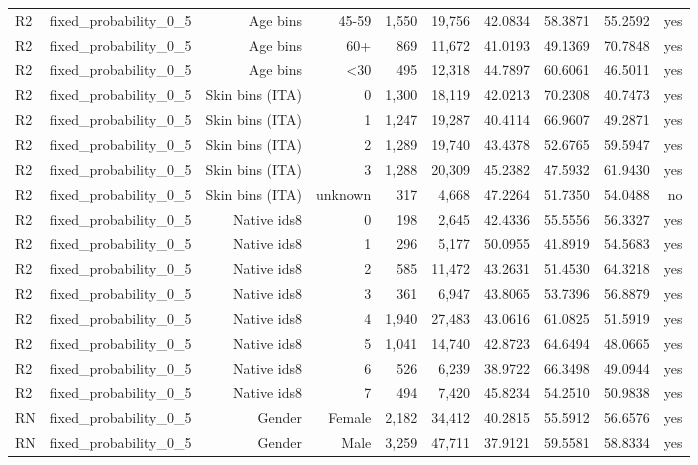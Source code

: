 \documentclass[10pt]{article}
\begin{document}
\begin{longtable}{@{}lrrrrrrrrr@{}}
R2 & fixed\_probability\_0\_5 & Age bins & 45-59 & 1,550 & 19,756 & 42.0834 & 58.3871 & 55.2592 & yes \\
R2 & fixed\_probability\_0\_5 & Age bins & 60+ & 869 & 11,672 & 41.0193 & 49.1369 & 70.7848 & yes \\
R2 & fixed\_probability\_0\_5 & Age bins & \textless{}30 & 495 & 12,318 & 44.7897 & 60.6061 & 46.5011 & yes \\
R2 & fixed\_probability\_0\_5 & Skin bins (ITA) & 0 & 1,300 & 18,119 & 42.0213 & 70.2308 & 40.7473 & yes \\
R2 & fixed\_probability\_0\_5 & Skin bins (ITA) & 1 & 1,247 & 19,287 & 40.4114 & 66.9607 & 49.2871 & yes \\
R2 & fixed\_probability\_0\_5 & Skin bins (ITA) & 2 & 1,289 & 19,740 & 43.4378 & 52.6765 & 59.5947 & yes \\
R2 & fixed\_probability\_0\_5 & Skin bins (ITA) & 3 & 1,288 & 20,309 & 45.2382 & 47.5932 & 61.9430 & yes \\
R2 & fixed\_probability\_0\_5 & Skin bins (ITA) & unknown & 317 & 4,668 & 47.2264 & 51.7350 & 54.0488 & no \\
R2 & fixed\_probability\_0\_5 & Native ids8 & 0 & 198 & 2,645 & 42.4336 & 55.5556 & 56.3327 & yes \\
R2 & fixed\_probability\_0\_5 & Native ids8 & 1 & 296 & 5,177 & 50.0955 & 41.8919 & 54.5683 & yes \\
R2 & fixed\_probability\_0\_5 & Native ids8 & 2 & 585 & 11,472 & 43.2631 & 51.4530 & 64.3218 & yes \\
R2 & fixed\_probability\_0\_5 & Native ids8 & 3 & 361 & 6,947 & 43.8065 & 53.7396 & 56.8879 & yes \\
R2 & fixed\_probability\_0\_5 & Native ids8 & 4 & 1,940 & 27,483 & 43.0616 & 61.0825 & 51.5919 & yes \\
R2 & fixed\_probability\_0\_5 & Native ids8 & 5 & 1,041 & 14,740 & 42.8723 & 64.6494 & 48.0665 & yes \\
R2 & fixed\_probability\_0\_5 & Native ids8 & 6 & 526 & 6,239 & 38.9722 & 66.3498 & 49.0944 & yes \\
R2 & fixed\_probability\_0\_5 & Native ids8 & 7 & 494 & 7,420 & 45.8234 & 54.2510 & 50.9838 & yes \\
RN & fixed\_probability\_0\_5 & Gender & Female & 2,182 & 34,412 & 40.2815 & 55.5912 & 56.6576 & yes \\
RN & fixed\_probability\_0\_5 & Gender & Male & 3,259 & 47,711 & 37.9121 & 59.5581 & 58.8334 & yes \\

\end{longtable}
\end{document}
